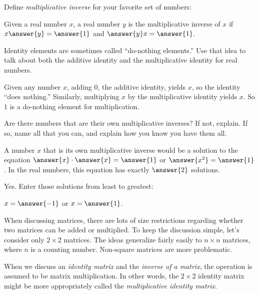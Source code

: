\documentclass[space,nooutcomes]{ximera}
\begin{document}
\begin{question}Define \emph{multiplicative inverse} for your favorite set of numbers:   

Given a real number $x$, a real number $y$ is the multiplicative inverse of $x$ if $x\answer{y}=\answer{1}$ 
and $\answer{y}x=\answer{1}$.  

\end{question}

\begin{question}Identity elements are sometimes called ``do-nothing elements.''  Use that idea to talk about both the additive identity and the multiplicative identity for real numbers.  
\begin{freeResponse}
\begin{hint}
Given any number $x$, adding $0$, the additive identity, yields $x$, so the identity ``does nothing.''  Similarly, multiplying $x$ by the multiplicative identity yields $x$.  So $1$ is a do-nothing element for multiplication.  
\end{hint}
\end{freeResponse}
\end{question}

\begin{question}
Are there numbers that are their own multiplicative inverses?  If not, explain.  If so, name all that you can, and explain how you know you have them all.
\begin{solution}
A number $x$ that is its own multiplicative inverse would be a solution to the equation $\answer{x}\cdot \answer{x}=\answer{1}$ or $\answer{x^2}=\answer{1}$.  In the real numbers, this equation has exactly $\answer{2}$ solutions.   
\begin{question}
Yes.  Enter those solutions from least to greatest: 

$x = \answer{-1}$ or $x = \answer{1}$.
\end{question}
\end{solution}
\end{question}

When discussing matrices, there are lots of size restrictions
regarding whether two matrices can be added or multiplied.  To keep
the discussion simple, let's consider only $2\times 2$ matrices.  The
ideas generalize fairly easily to $n\times n$ matrices, where $n$ is a
counting number.  Non-square matrices are more problematic.

When we discuss an \emph{identity matrix} and the \emph{inverse of a
  matrix}, the operation is assumed to be matrix multiplication.  In
other words, the $2\times 2$ identity matrix might be more
appropriately called the \emph{multiplicative identity matrix}.
\end{document}
